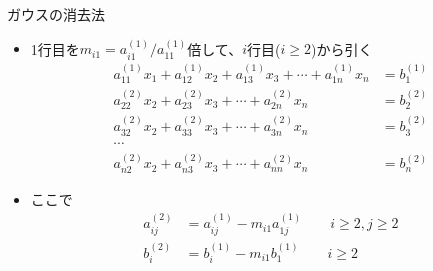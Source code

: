 \begin{frame}[t,fragile]{ガウスの消去法}
  \begin{itemize}
  \item 1行目を$m_{i1} = a_{i1}^{(1)}/a_{11}^{(1)}$倍して、$i$行目($i \ge 2$)から引く
    \begin{align*}
    a_{11}^{(1)} x_1 + a_{12}^{(1)} x_2 + a_{13}^{(1)} x_3 + \cdots + a_{1n}^{(1)} x_n &= b_{1}^{(1)} \\
    a_{22}^{(2)} x_2 + a_{23}^{(2)} x_3 + \cdots + a_{2n}^{(2)} x_n &= b_{2}^{(2)} \\
    a_{32}^{(2)} x_2 + a_{33}^{(2)} x_3 + \cdots + a_{3n}^{(2)} x_n &= b_{3}^{(2)} \\
    \cdots \\
    a_{n2}^{(2)} x_2 + a_{n3}^{(2)} x_3 + \cdots + a_{nn}^{(2)} x_n &= b_{n}^{(2)}
    \end{align*}
  \item ここで
    \begin{align*}
      a_{ij}^{(2)} &= a_{ij}^{(1)} - m_{i1} a_{1j}^{(1)} \qquad i \ge 2, j \ge 2 \\
      b_{i}^{(2)} &= b_{i}^{(1)} - m_{i1} b_{1}^{(1)} \qquad i \ge 2
    \end{align*}
  \end{itemize}
\end{frame}
